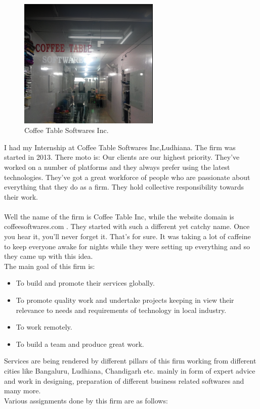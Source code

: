 
\begin{figure}[ht]
\centering
\includegraphics[width=0.6\textwidth]{input/images/coffee.png}
\caption{Coffee Table Softwares Inc.}
\end{figure}
\hspace{-1.7em}
 I had my Internship at Coffee Table Softwares Inc,Ludhiana.
 The firm was started in 2013. There moto is: Our clients are our highest priority. They've worked on a number of platforms and they always prefer using the latest technologies. They've got a great workforce of people who are passionate about everything that they do as a firm. They hold collective responsibility towards their work.\\\\
 Well the name of the firm is Coffee Table Inc, while the website domain is coffeesoftwares.com . They started with such a different yet catchy name. Once you hear it, you'll never forget it. That's for sure. It was taking a lot of caffeine to keep everyone awake for nights while they were setting up everything and so they came up with this idea.\\
The main goal of this firm is:
\begin{itemize}
\item To build and promote their services globally.
\item To promote quality work and undertake projects keeping in view their relevance to needs and requirements of technology in local industry.
\item To work remotely.
\item To build a team and produce great work.
\end{itemize}
Services are being rendered by different pillars of this firm working from different cities like Bangaluru, Ludhiana, Chandigarh etc. mainly in form of expert advice and work in designing, preparation of different business related softwares and many more.\\
Various assignments done by this firm are as follows:

